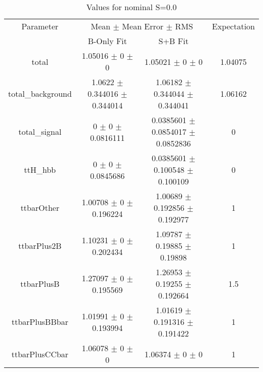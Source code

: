 \begin{table}
\centering
\caption{Values for nominal S=0.0}
\begin{tabular}{cccc}
\toprule
Parameter & \multicolumn{2}{c}{Mean $\pm$ Mean Error $\pm$ RMS} & Expectation\\
 & B-Only Fit & S+B Fit & \\
\midrule
total & \num{1.05016} $\pm$ \num{0} $\pm$ \num{0} & \num{1.05021} $\pm$ \num{0} $\pm$ \num{0} & \num{1.04075}\\
total\_background & \num{1.0622} $\pm$ \num{0.344016} $\pm$ \num{0.344014} & \num{1.06182} $\pm$ \num{0.344044} $\pm$ \num{0.344041} & \num{1.06162}\\
total\_signal & \num{0} $\pm$ \num{0} $\pm$ \num{0.0816111} & \num{0.0385601} $\pm$ \num{0.0854017} $\pm$ \num{0.0852836} & \num{0}\\
ttH\_hbb & \num{0} $\pm$ \num{0} $\pm$ \num{0.0845686} & \num{0.0385601} $\pm$ \num{0.100548} $\pm$ \num{0.100109} & \num{0}\\
ttbarOther & \num{1.00708} $\pm$ \num{0} $\pm$ \num{0.196224} & \num{1.00689} $\pm$ \num{0.192856} $\pm$ \num{0.192977} & \num{1}\\
ttbarPlus2B & \num{1.10231} $\pm$ \num{0} $\pm$ \num{0.202434} & \num{1.09787} $\pm$ \num{0.19885} $\pm$ \num{0.19898} & \num{1}\\
ttbarPlusB & \num{1.27097} $\pm$ \num{0} $\pm$ \num{0.195569} & \num{1.26953} $\pm$ \num{0.19255} $\pm$ \num{0.192664} & \num{1.5}\\
ttbarPlusBBbar & \num{1.01991} $\pm$ \num{0} $\pm$ \num{0.193994} & \num{1.01619} $\pm$ \num{0.191316} $\pm$ \num{0.191422} & \num{1}\\
ttbarPlusCCbar & \num{1.06078} $\pm$ \num{0} $\pm$ \num{0} & \num{1.06374} $\pm$ \num{0} $\pm$ \num{0} & \num{1}\\
\bottomrule
\end{tabular}
\end{table}